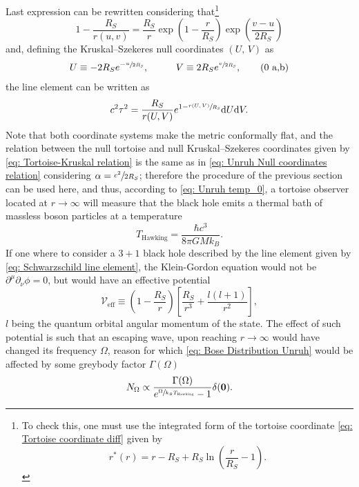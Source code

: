 Last expression can be rewritten considering that\footnote{To check this, one must use the integrated form of the tortoise coordinate \ref{eq: Tortoise coordinate diff} given by $$r^*(r)=r-R_S+R_S\ln\left(\frac{r}{R_S}-1\right).$$}
\begin{equation}
	1-\frac{R_S}{r\left(u,v\right)}=\frac{R_S}{r}\exp{\left(1-\frac{r}{R_S}\right)}\exp{\left(\frac{v-u}{2R_S}\right)}
\end{equation} 
and, defining the Kruskal–Szekeres null coordinates $(U,\,V)$ as
\begin{subequations}\label{eq: Tortoise-Kruskal relation}
	\begin{gather}
		U\equiv -2R_Se^{-\sfrac{u}{2R_S}},\hspace{1.0cm}V\equiv 2R_Se^{\sfrac{v}{2R_S}},\tag{\theequation \,\,a,b}
	\end{gather}
\end{subequations}
the line element can be written as
\begin{equation}
	c^2\tau^2=\frac{R_S}{r(U,V)}e^{1-\sfrac{r(U,V)}{R_S}}\text{d} U\text{d} V.
\end{equation}
Note that both coordinate systems make the metric conformally flat, and the relation between the null tortoise and null Kruskal–Szekeres coordinates given by \ref{eq: Tortoise-Kruskal relation} is the same as in \ref{eq: Unruh Null coordinates relation} considering $\alpha=\sfrac{c^2}{2R_S}$; therefore the procedure of the previous section can be used here, and thus, according to \ref{eq: Unruh temp_0}, a tortoise observer located at $r\to\infty$ will measure that the black hole emits a thermal bath of massless boson particles at a temperature 
\begin{equation}
	T_{\text{Hawking}}=\frac{\hbar c^3}{8\pi GMk_B}.
\end{equation}
If one where to consider a $3+1$ black hole described by the line element given by \ref{eq: Schwarzschild line element}, the Klein-Gordon equation would not be $\partial^\mu\partial_\nu\phi=0$, but would have an effective potential
\begin{equation}
	\mathcal{V}_{\text{eff}}\equiv\left(1-\frac{R_S}{r}\right)\left[\frac{R_S}{r^3}+\frac{l(l+1)}{r^2}\right],
\end{equation}
$l$ being the quantum orbital angular momentum of the state. The effect of such potential is such that an escaping wave, upon reaching $r\to\infty$ would have changed its frequency $\Omega$, reason for which \ref{eq: Bose Distribution Unruh} would be affected by some greybody factor $\Gamma(\Omega)$ 
\begin{equation}
	N_\Omega\propto\frac{\Gamma(\Omega)}{e^{\sfrac{\Omega}{k_BT_{\text{Hawking}}}}-1}\delta(\mathbf{0}).
\end{equation}

